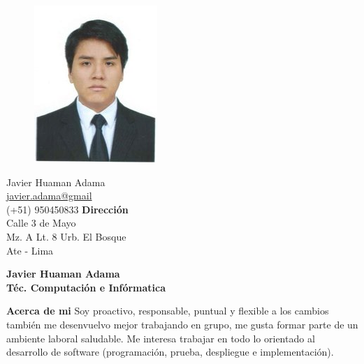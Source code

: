 \documentclass[a4paper,12pt,final]{memoir}
\newcommand{\Sep}{\vspace{1.5em}}
\newenvironment{AboutMe}
	{\ignorespaces\textbf{\color{RoyalBlue} Acerca de mi}}
	{\Sep\ignorespacesafterend}
\begin{document}
\begin{figure}
	\hfill
	\includegraphics[width=0.6\columnwidth]{profile}
	\vspace{-7cm}
\end{figure}

\begin{flushright}\small
	Javier Huaman Adama \\
	\url{javier.adama@gmail}  \\
	(+51) 950450833
	\Sep
	\textbf{Dirección} \\
	Calle 3 de Mayo \\ %
	Mz. A Lt. 8 Urb. El Bosque \\ %
	Ate - Lima \\ %
\end{flushright}\normalsize
\framebreak

\Huge\bfseries {\color{RoyalBlue} Javier Huaman Adama} \\
\Large\bfseries  Téc. Computación e Infórmatica \\

\normalsize\normalfont

\begin{AboutMe}
Soy proactivo, responsable, puntual y flexible a los cambios también me desenvuelvo mejor trabajando en grupo, me gusta formar parte de un ambiente laboral saludable. Me interesa trabajar en todo lo orientado al desarrollo de software (programación, prueba, despliegue e implementación).
\end{AboutMe}
\end{document}
